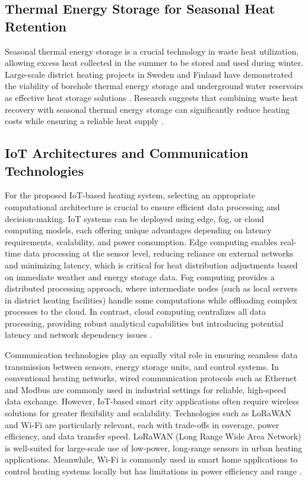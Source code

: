 \documentclass{article}
\begin{document}
\subsection{Thermal Energy Storage for Seasonal Heat Retention}
Seasonal thermal energy storage is a crucial technology in waste heat utilization, allowing excess heat collected in the summer to be stored and used during winter. Large-scale district heating projects in Sweden and Finland have demonstrated the viability of borehole thermal energy storage and underground water reservoirs as effective heat storage solutions \cite{stockholm_heat}. Research suggests that combining waste heat recovery with seasonal thermal energy storage can significantly reduce heating costs while ensuring a reliable heat supply \cite{tes_review}.

\subsection{IoT Architectures and Communication Technologies}

For the proposed IoT-based heating system, selecting an appropriate computational architecture is crucial to ensure efficient data processing and decision-making. IoT systems can be deployed using edge, fog, or cloud computing models, each offering unique advantages depending on latency requirements, scalability, and power consumption. Edge computing enables real-time data processing at the sensor level, reducing reliance on external networks and minimizing latency, which is critical for heat distribution adjustments based on immediate weather and energy storage data. Fog computing provides a distributed processing approach, where intermediate nodes (such as local servers in district heating facilities) handle some computations while offloading complex processes to the cloud. In contrast, cloud computing centralizes all data processing, providing robust analytical capabilities but introducing potential latency and network dependency issues \cite{iot_architecture}. 

Communication technologies play an equally vital role in ensuring seamless data transmission between sensors, energy storage units, and control systems. In conventional heating networks, wired communication protocols such as Ethernet and Modbus are commonly used in industrial settings for reliable, high-speed data exchange. However, IoT-based smart city applications often require wireless solutions for greater flexibility and scalability. Technologies such as LoRaWAN and Wi-Fi are particularly relevant, each with trade-offs in coverage, power efficiency, and data transfer speed. LoRaWAN (Long Range Wide Area Network) is well-suited for large-scale use of low-power, long-range sensors in urban heating applications. Meanwhile, Wi-Fi is commonly used in smart home applications to control heating systems locally but has limitations in power efficiency and range \cite{comm_tech_review}. 
\end{document}
